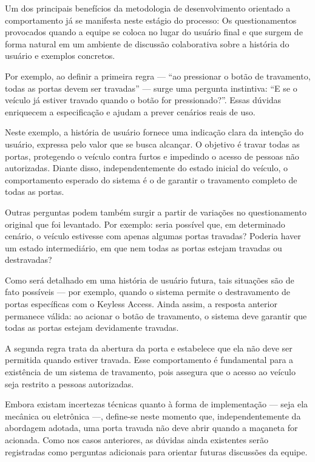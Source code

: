 Um dos principais benefícios da metodologia de desenvolvimento orientado a comportamento já se manifesta neste estágio do processo: Os questionamentos 
provocados quando a equipe se coloca no lugar do usuário final e que surgem de forma natural em um ambiente de discussão colaborativa sobre a história 
do usuário e exemplos concretos.

Por exemplo, ao definir a primeira regra — “ao pressionar o botão de travamento, todas as portas devem ser travadas” — surge uma pergunta instintiva: 
“E se o veículo já estiver travado quando o botão for pressionado?”. Essas dúvidas enriquecem a especificação e ajudam a prever cenários reais de uso.

Neste exemplo, a história de usuário fornece uma indicação clara da intenção do usuário, expressa pelo valor que se busca alcançar. O objetivo é travar todas 
as portas, protegendo o veículo contra furtos e impedindo o acesso de pessoas não autorizadas. Diante disso, independentemente do estado inicial do veículo, 
o comportamento esperado do sistema é o de garantir o travamento completo de todas as portas.

Outras perguntas podem também surgir a partir de variações no questionamento original que foi levantado. Por exemplo: seria possível que, em determinado cenário, 
o veículo estivesse com apenas algumas portas travadas? Poderia haver um estado intermediário, em que nem todas as portas estejam travadas ou destravadas?

Como será detalhado em uma história de usuário futura, tais situações são de fato possíveis — por exemplo, quando o sistema permite o destravamento de portas 
específicas com o Keyless Access. Ainda assim, a resposta anterior permanece válida: ao acionar o botão de travamento, o sistema deve garantir que todas as portas 
estejam devidamente travadas.

A segunda regra trata da abertura da porta e estabelece que ela não deve ser permitida quando estiver travada. Esse comportamento é fundamental para a existência 
de um sistema de travamento, pois assegura que o acesso ao veículo seja restrito a pessoas autorizadas.

Embora existam incertezas técnicas quanto à forma de implementação — seja ela mecânica ou eletrônica —, define-se neste momento que, independentemente da abordagem 
adotada, uma porta travada não deve abrir quando a maçaneta for acionada. Como nos casos anteriores, as dúvidas ainda existentes serão registradas como perguntas 
adicionais para orientar futuras discussões da equipe.

